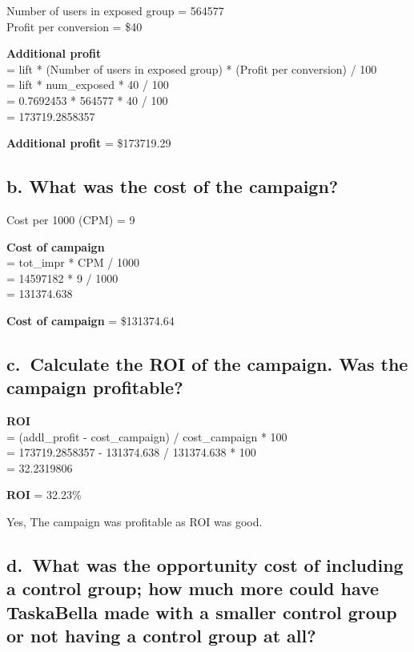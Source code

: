 \documentclass[
]{article}
\begin{document}
Number of users in exposed group = 564577\\
Profit per conversion = \$40

\textbf{Additional profit}\\
= lift * (Number of users in exposed group) * (Profit per conversion) /
100\\
= lift * num\_exposed * 40 / 100\\
= 0.7692453 * 564577 * 40 / 100\\
= 173719.2858357

\textbf{Additional profit} = \$173719.29

\hypertarget{b.-what-was-the-cost-of-the-campaign}{%
\subsection{b. What was the cost of the
campaign?}\label{b.-what-was-the-cost-of-the-campaign}}

Cost per 1000 (CPM) = 9

\textbf{Cost of campaign}\\
= tot\_impr * CPM / 1000\\
= 14597182 * 9 / 1000\\
= 131374.638

\textbf{Cost of campaign} = \$131374.64

\hypertarget{c.-calculate-the-roi-of-the-campaign.-was-the-campaign-profitable}{%
\subsection{c.~Calculate the ROI of the campaign. Was the campaign
profitable?}\label{c.-calculate-the-roi-of-the-campaign.-was-the-campaign-profitable}}

\textbf{ROI}\\
= (addl\_profit - cost\_campaign) / cost\_campaign * 100\\
= 173719.2858357 - 131374.638 / 131374.638 * 100\\
= 32.2319806

\textbf{ROI} = 32.23\%

Yes, The campaign was profitable as ROI was good.

\hypertarget{d.-what-was-the-opportunity-cost-of-including-a-control-group-how-much-more-could-have-taskabella-made-with-a-smaller-control-group-or-not-having-a-control-group-at-all}{%
\subsection{d.~What was the opportunity cost of including a control
group; how much more could have TaskaBella made with a smaller control
group or not having a control group at
all?}\label{d.-what-was-the-opportunity-cost-of-including-a-control-group-how-much-more-could-have-taskabella-made-with-a-smaller-control-group-or-not-having-a-control-group-at-all}}
\end{document}
